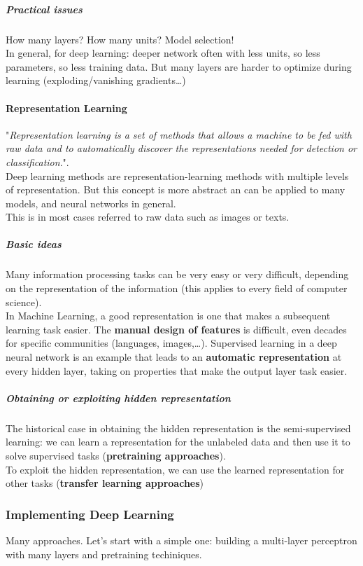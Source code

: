 \documentclass[10pt]{report}
\begin{document}
\subparagraph{Practical issues} How many layers? How many units? Model selection!\\
In general, for deep learning: deeper network often with less units, so less parameters, so less training data. But many layers are harder to optimize during learning (exploding/vanishing gradients\ldots)
\paragraph{Representation Learning} "\textit{Representation learning is a set of methods that allows a machine to be fed with raw data and to automatically discover the representations needed for detection or classification}.".\\
Deep learning methods are representation-learning methods with multiple levels of representation. But this concept is more abstract an can be applied to many models, and neural networks in general.\\
This is in most cases referred to raw data such as images or texts.
\subparagraph{Basic ideas} Many information processing tasks can be very easy or very difficult, depending on the representation of the information (this applies to every field of computer science).\\
In Machine Learning, a good representation is one that makes a subsequent learning task easier. The \textbf{manual design of features} is difficult, even decades for specific communities (languages, images,\ldots). Supervised learning in a deep neural network is an example that leads to an \textbf{automatic representation} at every hidden layer, taking on properties that make the output layer task easier.
\subparagraph{Obtaining or exploiting hidden representation} The historical case in obtaining the hidden representation is the semi-supervised learning: we can learn a representation for the unlabeled data and then use it to solve supervised tasks (\textbf{pretraining approaches}).\\
To exploit the hidden representation, we can use the learned representation for other tasks (\textbf{transfer learning approaches})
\subsubsection{Implementing Deep Learning} Many approaches. Let's start with a simple one: building a multi-layer perceptron with many layers and pretraining techiniques.
\end{document}
